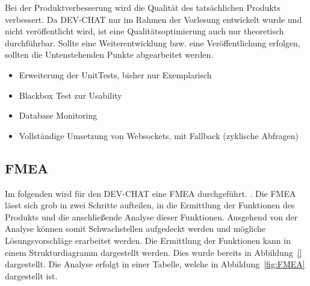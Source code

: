 \newparagraph
Bei der Produktverbesserung wird die Qualität des tatsächlichen Produkts verbessert.
Da DEV-CHAT nur im Rahmen der Vorlesung entwickelt wurde und nicht veröffentlicht wird, ist eine Qualitätsoptimierung auch nur theoretisch durchführbar. 
Sollte eine Weiterentwicklung bzw. eine Veröffentlichung erfolgen, sollten die Untenstehenden Punkte abgearbeitet werden.
\begin{itemize}
    \item Erweiterung der UnitTests, bisher nur Exemplarisch
    \item Blackbox Test zur Usability
    \item Database Monitoring
    \item Vollständige Umsetzung von Websockets, mit Fallback (zyklische Abfragen)
\end{itemize}

\subsection{\acl{FMEA}}
\label{sec:FMEA}
Im folgenden wird für den DEV-CHAT eine \ac{FMEA} durchgeführt.
 \autocite[][]{noauthor_fmea_nodate}.
\newparagraph
Die \ac{FMEA} lässt sich grob in zwei Schritte aufteilen, in die Ermittlung der Funktionen des Produkts und die anschließende Analyse dieser Funktionen. Ausgehend von der Analyse können somit Schwachstellen aufgedeckt werden und mögliche Lösungsvorschläge erarbeitet werden.
Die Ermittlung der Funktionen kann in einem Strukturdiagramm dargestellt werden.
Dies wurde bereits in Abbildung~\ref{} dargestellt.
Die Analyse erfolgt in einer Tabelle, welche in Abbildung~\ref{fig:FMEA} dargestellt ist.





